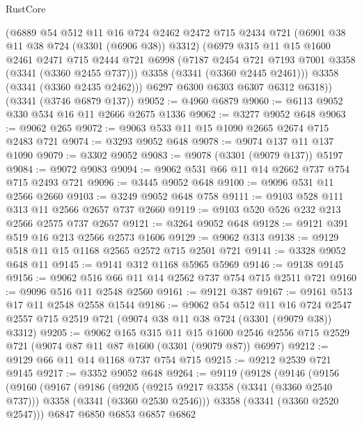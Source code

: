 \begin{lexlean}{RustCore}
\begin{coremodule}
        (@6889
          @54
          @512
          @11
          @16
          @724
          @2462
          @2472
          @715
          @2434
          @721
          (@6901 @38 @11 @38 @724 (@3301 (@6906 @38)) @3312)
          (@6979
            @315
            @11
            @15
            @1600
            @2461
            @2471
            @715
            @2444
            @721
            @6998
            (@7187 @2454 @721 @7193 @7001 @3358 (@3341 (@3360 @2455 @737)))
            @3358
            (@3341 (@3360 @2445 @2461)))
          @3358
          (@3341 (@3360 @2435 @2462)))
        @6297
        @6300
        @6303
        @6307
        @6312
        @6318))
    (@3341 (@3746 @6879 @137))
@9052 := @4960 @6879
@9060 := @6113 @9052 @330 @534 @16 @11 @2666 @2675 @1336
@9062 := @3277 @9052 @648
@9063 := @9062 @265
@9072 := @9063 @533 @11 @15 @1090 @2665 @2674 @715 @2483 @721
@9074 := @3293 @9052 @648
@9078 := @9074 @137 @11 @137 @1090
@9079 := @3302 @9052
@9083 := @9078 (@3301 (@9079 @137)) @5197
@9084 := @9072 @9083
@9094 := @9062 @531 @66 @11 @14 @2662 @737 @754 @715 @2493 @721
@9096 := @3445 @9052 @648
@9100 := @9096 @531 @11 @2566 @2660
@9103 := @3249 @9052 @648 @758
@9111 := @9103 @528 @111 @313 @11 @2566 @2657 @737 @2660
@9119 := @9103 @520 @526 @232 @213 @2566 @2575 @737 @2657
@9121 := @3264 @9052 @648
@9128 := @9121 @391 @519 @16 @213 @2566 @2573 @1606
@9129 := @9062 @313
@9138 := @9129 @518 @11 @15 @1168 @2565 @2572 @715 @2501 @721
@9141 := @3328 @9052 @648 @11
@9145 := @9141 @312 @1168 @5965 @5969
@9146 := @9138 @9145
@9156 := @9062 @516 @66 @11 @14 @2562 @737 @754 @715 @2511 @721
@9160 := @9096 @516 @11 @2548 @2560
@9161 := @9121 @387
@9167 := @9161 @513 @17 @11 @2548 @2558 @1544
@9186 := @9062
    @54
    @512
    @11
    @16
    @724
    @2547
    @2557
    @715
    @2519
    @721
    (@9074 @38 @11 @38 @724 (@3301 (@9079 @38)) @3312)
@9205 := @9062
    @165
    @315
    @11
    @15
    @1600
    @2546
    @2556
    @715
    @2529
    @721
    (@9074 @87 @11 @87 @1600 (@3301 (@9079 @87)) @6997)
@9212 := @9129 @66 @11 @14 @1168 @737 @754 @715
@9215 := @9212 @2539 @721 @9145
@9217 := @3352 @9052 @648
@9264 := @9119
    (@9128
      (@9146
        (@9156
          (@9160
            (@9167
              (@9186
                (@9205
                  (@9215 @9217 @3358 (@3341 (@3360 @2540 @737)))
                  @3358
                  (@3341 (@3360 @2530 @2546)))
                @3358
                (@3341 (@3360 @2520 @2547)))
              @6847
              @6850
              @6853
              @6857
              @6862

\end{coremodule}
\end{lexlean}
